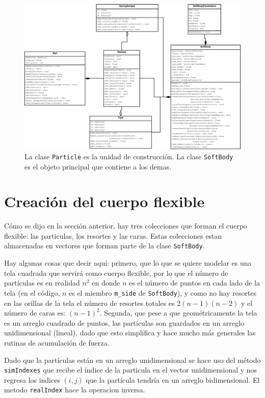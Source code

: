\begin{figure}
 \centering
 \includegraphics[width=\textwidth]{Img/03/diagramaClases}
 \caption[Diagrama de clases]{ 
 La clase \texttt{Particle} es la unidad de construcción. La clase \texttt{SoftBody} es el objeto principal que contiene a los demas. 
 } \label{clases:fig}
\end{figure}

\section{Creación del cuerpo flexible}

Cómo se dijo en la sección anterior, hay tres colecciones que forman el cuerpo flexible: las particulas, los resortes y las caras. Estas colecciones estan almacenadas en vectores que forman parte de la clase \texttt{SoftBody}.

Hay algunas cosas que decir aquí: primero, que lo que se quiere modelar es una tela cuadrada que servirá como cuerpo flexible, por lo que el número de partículas es en realidad $n^{2}$ en donde $n$ es el número de puntos en cada lado de la tela (en el código, $n$ es el miembro \texttt{m_side} de \texttt{SoftBody}), y como no hay resortes en las orillas de la tela el número de resortes totales es $2 (n - 1) (n - 2)$ y el número de caras es: $(n-1)^{2}$.
Segunda, que pese a que geométricamente la tela es un arreglo cuadrado de puntos, las partículas son guardados en un arreglo unidimensional (lineal), dado que esto  simplifica y hace mucho más generales las rutinas de acumulación de fuerza.

Dado que la partículas están en un arreglo unidimensional se hace uso del método \texttt{simIndexes} que recibe el índice de la particula en el vector unidimensional y nos regresa los indices $(i, j)$ que la partícula tendría en un arreglo bidimensional. El metodo \texttt{realIndex} hace la operacion inversa.

